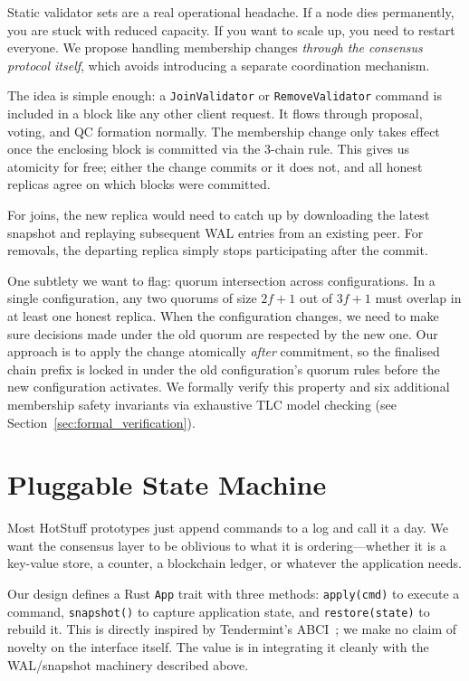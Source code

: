 Static validator sets are a real operational headache.  If a node dies permanently, you are
stuck with reduced capacity.  If you want to scale up, you need to restart everyone.  We
propose handling membership changes \emph{through the consensus protocol itself}, which
avoids introducing a separate coordination mechanism.

The idea is simple enough: a \texttt{JoinValidator} or \texttt{RemoveValidator} command is
included in a block like any other client request.  It flows through proposal, voting, and
QC formation normally.  The membership change only takes effect once the enclosing block is
committed via the 3-chain rule.  This gives us atomicity for free; either the change commits
or it does not, and all honest replicas agree on which blocks were committed.

For joins, the new replica would need to catch up by downloading the latest snapshot and
replaying subsequent WAL entries from an existing peer.  For removals, the departing replica
simply stops participating after the commit.

One subtlety we want to flag: quorum intersection across configurations.  In a single
configuration, any two quorums of size $2f{+}1$ out of $3f{+}1$ must overlap in at least
one honest replica.  When the configuration changes, we need to make sure decisions made
under the old quorum are respected by the new one.  Our approach is to apply the change
atomically \emph{after} commitment, so the finalised chain prefix is locked in under the old
configuration's quorum rules before the new configuration activates.  We formally verify
this property and six additional membership safety invariants via exhaustive TLC model
checking (see Section~\ref{sec:formal_verification}).

\section{Pluggable State Machine}
\label{sec:pluggable_sm}

Most HotStuff prototypes just append commands to a log and call it a day.  We want the
consensus layer to be oblivious to what it is ordering---whether it is a key-value store, a
counter, a blockchain ledger, or whatever the application needs.

Our design defines a Rust \texttt{App} trait with three methods: \texttt{apply(cmd)} to
execute a command, \texttt{snapshot()} to capture application state, and
\texttt{restore(state)} to rebuild it.  This is directly inspired by Tendermint's
ABCI~\cite{tendermint}; we make no claim of novelty on the interface itself.  The value is
in integrating it cleanly with the WAL/snapshot machinery described above.

